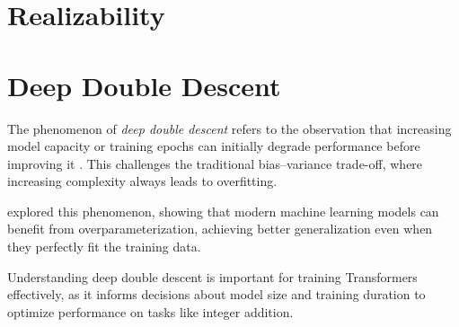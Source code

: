 \section{Realizability}\label{sec:realizability}


\section{Deep Double Descent}\label{sec:deep_double_descent}

The phenomenon of \emph{deep double descent} refers to the observation that increasing model capacity or training epochs can initially degrade performance before improving it \parencite{nakkiran_deep_2021}. This challenges the traditional bias–variance trade-off, where increasing complexity always leads to overfitting.

\textcite{belkin_reconciling_2019} explored this phenomenon, showing that modern machine learning models can benefit from overparameterization, achieving better generalization even when they perfectly fit the training data.

Understanding deep double descent is important for training Transformers effectively, as it informs decisions about model size and training duration to optimize performance on tasks like integer addition.

